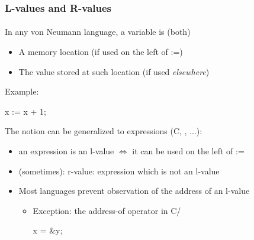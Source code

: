 \documentclass{beamer}
\begin{document}
\begin{frame}[fragile]
\frametitle{L-values and R-values}
\framesubtitle{}
In any von Neumann language, a variable is (both)
\begin{itemize} 
    \item A memory location                 (if used on the left of :=)
    \item The value stored at such location  (if used \emph{elsewhere})
\end{itemize}

Example:
\begin{cplus3}
     x := x + 1;
\end{cplus3}

The notion can be generalized to expressions (C, \cpp, ...):
\begin{itemize}
\item an expression is an l-value $\Leftrightarrow$ it can be used on the left of :=
\item (sometimes): r-value: expression which is not an l-value
%
\item Most languages prevent observation of the address of an l-value
\begin{itemize}
\item Exception: the address-of operator in C/\cpp
\begin{cplus3}
  x = &y;
\end{cplus3}
\end{itemize}
\end{itemize}


\end{frame}
\end{document}
